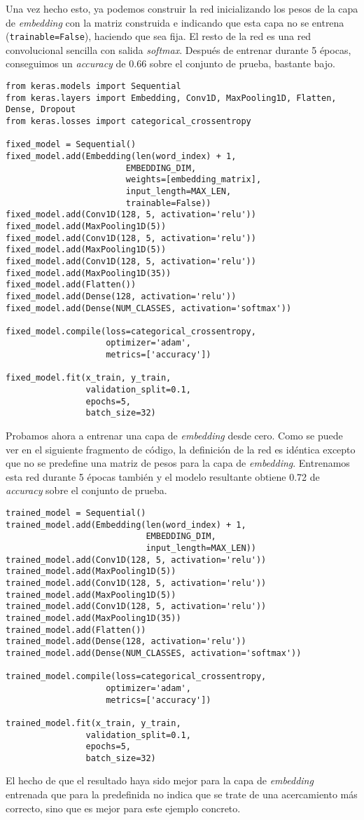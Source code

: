 Una vez hecho esto, ya podemos construir la red inicializando los pesos de la capa
de \textit{embedding} con la matriz construida e indicando que esta capa no se
entrena (\texttt{trainable=False}), haciendo que sea fija. El resto de la red es
una red convolucional sencilla con salida \textit{softmax}. Después de entrenar
durante 5 épocas, conseguimos un \textit{accuracy} de 0.66 sobre el conjunto de
prueba, bastante bajo.

\begin{lstlisting}
from keras.models import Sequential
from keras.layers import Embedding, Conv1D, MaxPooling1D, Flatten, Dense, Dropout
from keras.losses import categorical_crossentropy
    
fixed_model = Sequential()
fixed_model.add(Embedding(len(word_index) + 1,
                        EMBEDDING_DIM,
                        weights=[embedding_matrix],
                        input_length=MAX_LEN,
                        trainable=False))
fixed_model.add(Conv1D(128, 5, activation='relu'))
fixed_model.add(MaxPooling1D(5))
fixed_model.add(Conv1D(128, 5, activation='relu'))
fixed_model.add(MaxPooling1D(5))
fixed_model.add(Conv1D(128, 5, activation='relu'))
fixed_model.add(MaxPooling1D(35))
fixed_model.add(Flatten())
fixed_model.add(Dense(128, activation='relu'))
fixed_model.add(Dense(NUM_CLASSES, activation='softmax'))
    
fixed_model.compile(loss=categorical_crossentropy,
                    optimizer='adam',
                    metrics=['accuracy'])

fixed_model.fit(x_train, y_train,
                validation_split=0.1,
                epochs=5,
                batch_size=32)
\end{lstlisting}

Probamos ahora a entrenar una capa de \textit{embedding} desde cero. Como se
puede ver en el siguiente fragmento de código, la definición de la red es
idéntica excepto que no se predefine una matriz de pesos para la capa de
\textit{embedding}. Entrenamos esta red durante 5 épocas también y el modelo
resultante obtiene 0.72 de \textit{accuracy} sobre el conjunto de prueba.

\begin{lstlisting}
trained_model = Sequential()
trained_model.add(Embedding(len(word_index) + 1,
                            EMBEDDING_DIM,
                            input_length=MAX_LEN))
trained_model.add(Conv1D(128, 5, activation='relu'))
trained_model.add(MaxPooling1D(5))
trained_model.add(Conv1D(128, 5, activation='relu'))
trained_model.add(MaxPooling1D(5))
trained_model.add(Conv1D(128, 5, activation='relu'))
trained_model.add(MaxPooling1D(35))
trained_model.add(Flatten())
trained_model.add(Dense(128, activation='relu'))
trained_model.add(Dense(NUM_CLASSES, activation='softmax'))
    
trained_model.compile(loss=categorical_crossentropy,
                    optimizer='adam',
                    metrics=['accuracy'])

trained_model.fit(x_train, y_train,
                validation_split=0.1,
                epochs=5,
                batch_size=32)
\end{lstlisting}

El hecho de que el resultado haya sido mejor para la capa de \textit{embedding}
entrenada que para la predefinida no indica que se trate de una acercamiento más
correcto, sino que es mejor para este ejemplo concreto.

